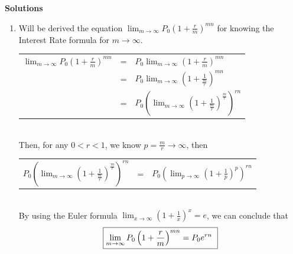 \documentclass{article}
\begin{document}
	\pagebreak
	\textbf{Solutions}
	\begin{enumerate}
		\item Will be derived the equation $\displaystyle\lim_{m\rightarrow\infty}P_0\left(1+\frac{r}{m}\right)^{mn}$ for knowing the Interest Rate formula for $m\rightarrow\infty$.\vspace{0.5cm}\\
		\begin{tabular}{cll}
			$\displaystyle\lim_{m\rightarrow\infty}P_0\left(1+\frac{r}{m}\right)^{mn}$&=&$P_0\displaystyle\lim_{m\rightarrow\infty}\left(1+\frac{r}{m}\right)^{mn}$\vspace{0.15cm}\\
			&=&$P_0\displaystyle\lim_{m\rightarrow\infty}\left(1+\frac{1}{\frac{m}{r}}\right)^{mn}$\vspace{0.15cm}\\
			&=&$P_0\displaystyle\left(\lim_{m\rightarrow\infty}\left(1+\frac{1}{\frac{m}{r}}\right)^{\frac{m}{r}}\right)^{rn}$\vspace{0.15cm}\\
		\end{tabular}\\
		Then, for any $0<r<1$, we know $\displaystyle p=\frac{m}{r}\rightarrow\infty$, then\vspace{0.15cm}\\
		\begin{tabular}{cll}
			$P_0\displaystyle\left(\lim_{m\rightarrow\infty}\left(1+\frac{1}{\frac{m}{r}}\right)^{\frac{m}{r}}\right)^{rn}$&=&$P_0\displaystyle\left(\lim_{p\rightarrow\infty}\left(1+\frac{1}{p}\right)^{p}\right)^{rn}$\vspace{0.15cm}\\
		\end{tabular}\\
		By using the Euler formula $\displaystyle\lim_{x\rightarrow\infty}\left(1+\frac{1}{x}\right)^x=e$, we can conclude that \\ 
		\begin{equation*}
		\fbox{%
			$\displaystyle\lim_{m\rightarrow\infty}P_0\left(1+\frac{r}{m}\right)^{mn}=P_0e^{rn}$
		}
		\end{equation*}
		

\end{enumerate}
\end{document}
